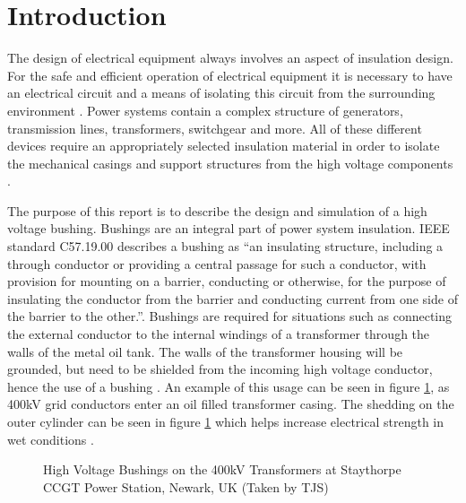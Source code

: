 \section{Introduction}
The design of electrical equipment always involves an aspect of insulation design.
For the safe and efficient operation of electrical equipment it is necessary to have an electrical circuit and a means of isolating this circuit from the surrounding environment \cite{warne2005newnes}.
Power systems contain a complex structure of generators, transmission lines, transformers, switchgear and more. 
All of these different devices require an appropriately selected insulation material in order to isolate the mechanical casings and support structures from the high voltage components \cite{james2008condition}.

The purpose of this report is to describe the design and simulation of a high voltage bushing. Bushings are an integral part of power system insulation. 
IEEE standard C57.19.00 describes a bushing as ``an insulating structure, including a through conductor or providing a central passage for such a conductor, with provision for mounting on a barrier, conducting or otherwise, for the purpose of insulating the conductor from the barrier and conducting current from one side of the barrier to the other.''\cite{1440990}.
Bushings are required for situations such as connecting the external conductor to the internal windings of a transformer through the walls of the metal oil tank.
The walls of the transformer housing will be grounded, but need to be shielded from the incoming high voltage conductor, hence the use of a bushing \cite{warne2005newnes}.
An example of this usage can be seen in figure \ref{Figure:BothBushPics}, as 400kV grid conductors enter an oil filled transformer casing.
The shedding on the outer cylinder can be seen in figure \ref{Figure:BothBushPics} which helps increase electrical strength in wet conditions \cite{warne2005newnes}.

\begin{figure}[!htb]
  \centering
\caption{High Voltage Bushings on the 400kV Transformers at Staythorpe CCGT Power Station, Newark, UK (Taken by TJS)}
  \label{Figure:BothBushPics}
\end{figure}

